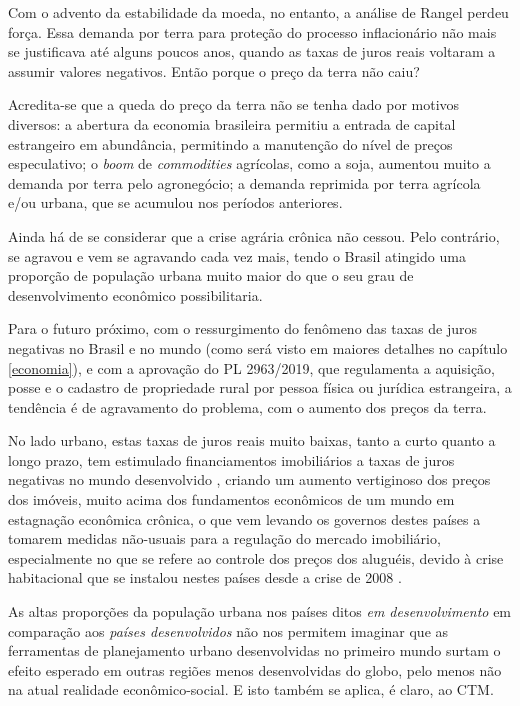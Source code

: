 \documentclass[
	12pt,				%
	oneside,			%
	a4paper,			%
	chapter=TITLE,		%
	section=TITLE,		%
	english,			%
	brazil				%
	]{abntex2}
\begin{document}
\begin{refsection}
Com o advento da estabilidade da moeda, no entanto, a análise de Rangel perdeu
força. Essa demanda por terra para proteção do processo inflacionário não mais
se justificava até alguns poucos anos, quando as taxas de juros reais voltaram
a assumir valores negativos. Então porque o preço da terra não caiu?

Acredita-se que a queda do preço da terra não se tenha dado por motivos diversos:
a abertura da economia brasileira permitiu a entrada de capital estrangeiro em
abundância, permitindo a manutenção do nível de preços especulativo; o \emph{boom} de
\emph{commodities} agrícolas, como a soja, aumentou muito a demanda por terra pelo
agronegócio; a demanda reprimida por terra agrícola e/ou urbana, que se acumulou
nos períodos anteriores.

Ainda há de se considerar que a crise agrária crônica não cessou. Pelo contrário,
se agravou e vem se agravando cada vez mais, tendo o Brasil atingido uma
proporção de população urbana muito maior do que o seu grau de desenvolvimento
econômico possibilitaria.

Para o futuro próximo, com o ressurgimento do fenômeno das taxas de
juros negativas no Brasil e no mundo (como será visto em maiores detalhes no
capítulo \ref{economia}), e com a aprovação do PL 2963/2019, que regulamenta
a aquisição, posse e o cadastro de propriedade rural por pessoa física ou
jurídica estrangeira, a tendência é de agravamento do problema, com o aumento
dos preços da terra.

No lado urbano, estas taxas de juros reais muito baixas, tanto a curto quanto a
longo prazo, tem estimulado financiamentos imobiliários a taxas de juros
negativas no mundo desenvolvido \autocite{serapicos}, criando um aumento vertiginoso dos
preços dos imóveis, muito acima dos fundamentos econômicos de um mundo em
estagnação econômica crônica, o que vem levando os governos destes países a
tomarem medidas não-usuais para a regulação do mercado imobiliário,
especialmente no que se refere ao controle dos preços dos aluguéis, devido à
crise habitacional que se instalou nestes países desde a crise de 2008 \autocite{berlim,londres,california,suecia,newzeland,finlandia}.

As altas proporções da população urbana nos países ditos \emph{em desenvolvimento} em
comparação aos \emph{países desenvolvidos} não nos permitem imaginar que as
ferramentas de planejamento urbano desenvolvidas no primeiro mundo surtam o
efeito esperado em outras regiões menos desenvolvidas do globo, pelo menos não
na atual realidade econômico-social. E isto também se aplica, é claro, ao
\gls{CTM}.


\end{refsection}
\end{document}
